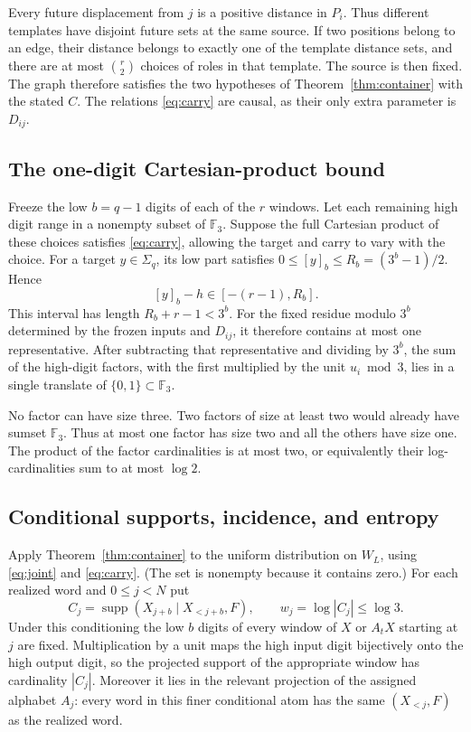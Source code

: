 \documentclass[11pt]{article}
\theoremstyle{definition}
\theoremstyle{remark}
\newcommand{\F}{\mathbb F}
\newcommand{\supp}{\operatorname{supp}}
\begin{document}
Every future displacement from $j$ is a positive distance in $P_i$.
Thus different templates have disjoint future sets at the same source.
If two positions belong to an edge, their distance belongs to exactly
one of the template distance sets, and there are at most
$\binom r2$ choices of roles in that template. The source is then
fixed. The graph therefore satisfies the two hypotheses of
Theorem~\ref{thm:container} with the stated $C$. The relations
\eqref{eq:carry} are causal, as their only extra parameter is $D_{ij}$.

\subsection{The one-digit Cartesian-product bound}
Freeze the low $b=q-1$ digits of each of the $r$ windows. Let each
remaining high digit range in a nonempty subset of $\F_3$. Suppose
the full Cartesian product of these choices satisfies
\eqref{eq:carry}, allowing the target and carry to vary with the choice.
For a target $y\in\Sigma_q$, its low part satisfies
$0\le[y]_b\le R_b=(3^b-1)/2$. Hence
\[
 [y]_b-h\in[-(r-1),R_b].
\]
This interval has length $R_b+r-1<3^b$. For the fixed residue modulo
$3^b$ determined by the frozen inputs and $D_{ij}$, it therefore
contains at most one representative. After subtracting that
representative and dividing by $3^b$, the sum of the high-digit factors,
with the first multiplied by the unit $u_i\bmod3$, lies in a single
translate of $\{0,1\}\subset\F_3$.

No factor can have size three. Two factors of size at least two would
already have sumset $\F_3$. Thus at most one factor has size two and
all the others have size one. The product of the factor cardinalities
is at most two, or equivalently their log-cardinalities sum to at most
$\log2$.

\subsection{Conditional supports, incidence, and entropy}
Apply Theorem~\ref{thm:container} to the uniform distribution on $W_L$,
using \eqref{eq:joint} and \eqref{eq:carry}. (The set is nonempty
because it contains zero.) For each realized word and $0\le j<N$ put
\[
 C_j=\supp(X_{j+b}\mid X_{<j+b},F),\qquad w_j=\log|C_j|\le\log3.
\]
Under this conditioning the low $b$ digits of every window of $X$ or
$A_tX$ starting at $j$ are fixed. Multiplication by a unit maps the
high input digit bijectively onto the high output digit, so the
projected support of the appropriate window has cardinality $|C_j|$.
Moreover it lies in the relevant projection of the assigned alphabet
$A_j$: every word in this finer conditional atom has the same
$(X_{<j},F)$ as the realized word.
\end{document}
